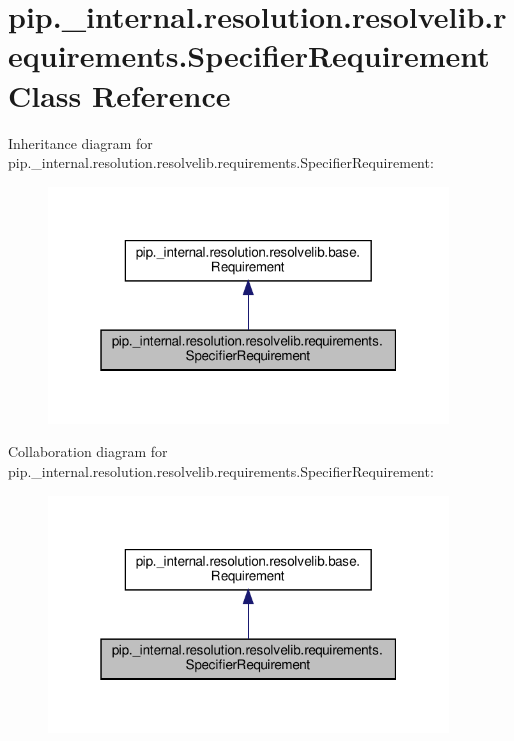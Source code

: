 \hypertarget{classpip_1_1__internal_1_1resolution_1_1resolvelib_1_1requirements_1_1SpecifierRequirement}{}\section{pip.\+\_\+internal.\+resolution.\+resolvelib.\+requirements.\+Specifier\+Requirement Class Reference}
\label{classpip_1_1__internal_1_1resolution_1_1resolvelib_1_1requirements_1_1SpecifierRequirement}


Inheritance diagram for pip.\+\_\+internal.\+resolution.\+resolvelib.\+requirements.\+Specifier\+Requirement\+:
\nopagebreak
\begin{figure}[H]
\begin{center}
\leavevmode
\includegraphics[width=301pt]{classpip_1_1__internal_1_1resolution_1_1resolvelib_1_1requirements_1_1SpecifierRequirement__inherit__graph}
\end{center}
\end{figure}


Collaboration diagram for pip.\+\_\+internal.\+resolution.\+resolvelib.\+requirements.\+Specifier\+Requirement\+:
\nopagebreak
\begin{figure}[H]
\begin{center}
\leavevmode
\includegraphics[width=301pt]{classpip_1_1__internal_1_1resolution_1_1resolvelib_1_1requirements_1_1SpecifierRequirement__coll__graph}
\end{center}
\end{figure}
